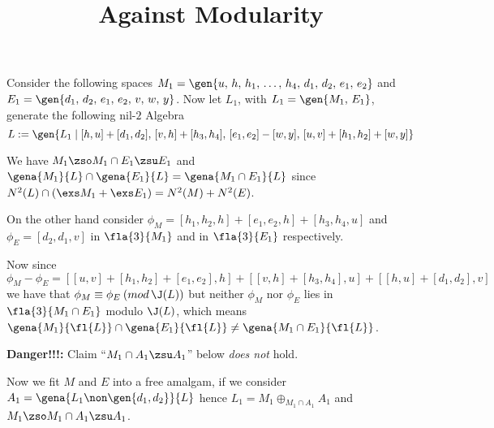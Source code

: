 \documentclass[a4paper,11pt,german,english]{article}
\title{Against Modularity}
\begin{document}
\maketitle
Consider the following spaces
$M_{1}=\gen{u,\,h,\,h_{1},\,\dots,\,h_{4},\,d_{1},\,d_{2},\,e_{1},\,e_{2}}$ %
and
$E_{1}=\gen{d_{1},\,d_{2},\,e_{1},\,e_{2},\,v,\,w,\,y}$. %
Now let $L_{1}$, with $L_{1}=\gen{M_{1},\, E_{1}}$, generate the following nil-$2$ Algebra
$$L:=\gen{L_{1}\mid [h,u]+[d_{1},d_{2}],\,[v,h]+[h_{3},h_{4}],\,[e_{1},e_{2}]-[w,y],\,
[u,v]+[h_{1},h_{2}]+[w,y]}$$

\smallskip
We have $M_{1}\zso M_{1}\cap E_{1}\zsu E_{1}$ and $\gena{M_{1}}{L}\cap\gena{E_{1}}{L}=\gena{M_{1}\cap E_{1}}{L}$ since
$N^{2}(L)\cap(\exs M_{1}+\exs E_{1})=N^{2}(M)+N^{2}(E)$.

\smallskip
On the other hand consider $\phi_{M}=[h_{1},h_{2},h]+[e_{1},e_{2},h]+[h_{3},h_{4},u]$
and $\phi_{E}=[d_{2},d_{1},v]$ in $\fla{3}{M_{1}}$ and in $\fla{3}{E_{1}}$ respectively.

Now since
$$
\phi_{M}-\phi_{E}=[[u,v]+[h_{1},h_{2}]+[e_{1},e_{2}] ,h] + [[v,h]+[h_{3},h_{4}],u] + [[h,u]+[d_{1},d_{2}],v]
$$
we have that $\phi_{M}\equiv\phi_{E}\:(mod\,\J(L))$ but neither $\phi_{M}$ nor $\phi_{E}$ lies
in $\fla{3}{M_{1}\cap E_{1}}$ modulo $\J(L)$, which means
$\gena{M_{1}}{\fl{L}}\cap\gena{E_{1}}{\fl{L}}\neq\gena{M_{1}\cap E_{1}}{\fl{L}}$.

\medskip
{\bf Danger!!!:} Claim ``$M_{1}\cap A_{1}\zsu A_{1}$'' below {\em does not} hold.

Now we fit $M$ and $E$ into a free amalgam, if we consider $A_{1}=
\gena{L_{1}\non\gen{d_{1},d_{2}}}{L}$ hence $L_{1}=M_{1}\oplus_{M_{1}\cap A_{1}} A_{1}$ and
$M_{1}\zso M_{1}\cap A_{1}\zsu A_{1}$.
\end{document}
